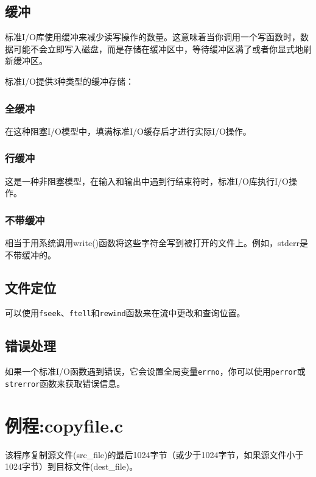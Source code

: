 \documentclass[12pt, a4paper, oneside]{ctexbook}
\numberwithin{figure}{section}
\begin{document}
\subsection{缓冲}

标准I/O库使用缓冲来减少读写操作的数量。这意味着当你调用一个写函数时，数据可能不会立即写入磁盘，而是存储在缓冲区中，等待缓冲区满了或者你显式地刷新缓冲区。

标准I/O提供3种类型的缓冲存储：

\subsubsection{全缓冲}

在这种阻塞I/O模型中，填满标准I/O缓存后才进行实际I/O操作。

\subsubsection{行缓冲}

这是一种非阻塞模型，在输入和输出中遇到行结束符时，标准I/O库执行I/O操作。

\subsubsection{不带缓冲}

相当于用系统调用write()函数将这些字符全写到被打开的文件上。例如，stderr是不带缓冲的。

\subsection{文件定位}

可以使用\texttt{fseek}、\texttt{ftell}和\texttt{rewind}函数来在流中更改和查询位置。

\subsection{错误处理}

如果一个标准I/O函数遇到错误，它会设置全局变量\texttt{errno}，你可以使用\texttt{perror}或\texttt{strerror}函数来获取错误信息。


\section{例程:copyfile.c}

该程序复制源文件(src_file)的最后1024字节（或少于1024字节，如果源文件小于1024字节）到目标文件(dest_file)。
\end{document}
